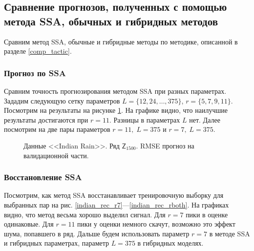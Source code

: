 \documentclass[specialist,
               substylefile = spbu.rtx,
               subf,href,colorlinks=true, 12p]{disser}
\newcommand{\multiref}[2]{\ref{#1}---\ref{#2}}
\begin{document}
\subsection{Сравнение прогнозов, полученных с помощью метода SSA, обычных и гибридных методов}
Сравним метод SSA, обычные и гибридные методы по методике, описанной в разделе \ref{comp_tactic}.

\subsubsection{Прогноз по SSA}
Сравним точность прогнозирования методом SSA при разных параметрах. Зададим следующую сетку параметров $L = \{12, 24, \ldots, 375\}$, $r = \{5, 7, 9, 11\}$. Посмотрим на результаты на рисунке \ref{rain_ssa_forecast}. На графике видно, что наилучшие результаты достигаются при $r = 11$. Разницы в параметрах $L$ нет. Далее посмотрим на две пары параметров $r = 11, \; L = 375$ и $r = 7, \; L = 375$.

\begin{figure}[H]
	\captionsetup{justification=centering}
	\caption{Данные <<Indian Rain>>. Ряд $\mathsf{Z}_{1500}$. RMSE прогноз на валидационной части.}
	\label{rain_ssa_forecast}
\end{figure}

\subsubsection{Восстановление SSA}

Посмотрим, как метод SSA восстанавливает тренировочную выборку для выбранных пар на рис. \multiref{indian_rec_r7}{indian_rec_rboth}. На графиках видно, что метод весьма хорошо выделил сигнал. Для $r = 7$ пики в оценке одинаковые. Для $r=11$ пики у оценки немного скачут, возможно это эффект шума, попавшего в ряд. Дальше будем использовать параметр $r = 7$ в методе SSA и гибридных параметрах, параметр $L = 375$ в гибридных моделях.
\end{document}
